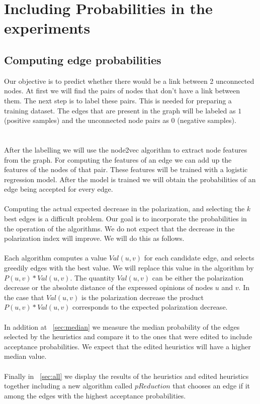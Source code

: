 \chapter{Including Probabilities in the experiments}		
 \label{sec:prob}		

\section{Computing edge probabilities }		
\label{sec:computingEdge}		
\vspace{20pt}
Our objective is to predict whether there would be a link between 2 unconnected nodes. At first we will find the pairs of nodes that don't have a link between them.	
The next step is to label these pairs. This is needed for preparing a training dataset. 
The edges that are present in the graph will be labeled as $1$ (positive samples) and the unconnected node pairs as $0$ (negative samples).		
\\
\\
\\
\noindent After the labelling we will use the node2vec algorithm to extract node features from the graph. For computing the features of an edge we can add up the features of the nodes of that pair. These features will be trained with a logistic regression model. After the model is trained we will obtain the probabilities of an edge being accepted for every edge.
\\
\\
\noindent Computing the actual expected decrease in the polarization, and selecting the $k$ best edges is a difficult problem. Our goal is to incorporate the probabilities in the operation of the algorithms. We do not expect that the decrease in the polarization index will improve. We will do this as follows. 
\\
\\
Each algorithm computes a value $Val(u,v)$ for each candidate edge, and selects greedily edges with the best value. We will replace this value in the algorithm by $P(u,v)*Val(u,v)$. The quantity $Val(u,v)$ can be either the polarization decrease or the absolute distance of the expressed opinions of nodes $u$ and $v$. In the case that $Val(u,v)$ is the polarization decrease the product $P(u,v)*Val(u,v)$ corresponds to the expected polarization decrease.
\\
\\
In addition at ~\ref{sec:median} we measure the median probability of the edges selected by the heuristics and compare it to the ones that were edited to include acceptance probabilities. We expect that the edited heuristics will have a higher median value.
\\
\\
Finally in ~\ref{sec:all} we display the results of the heuristics and edited heuristics together including a new algorithm called $pReduction$ that chooses an edge if it among the edges with the highest acceptance probabilities.

